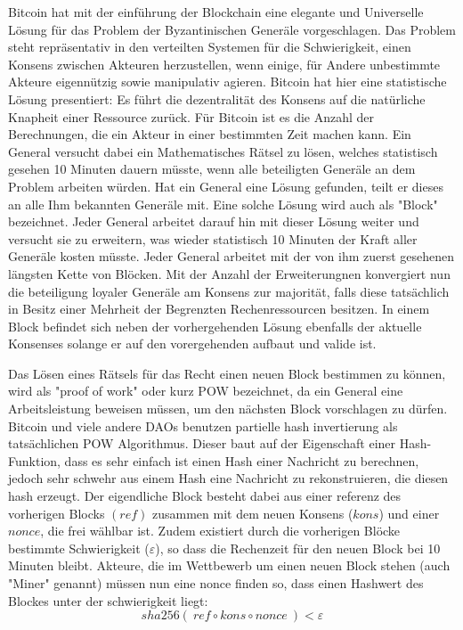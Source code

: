 \documentclass[]{article}
\begin{document}
Bitcoin hat mit der einführung der Blockchain eine elegante und Universelle Lösung für das Problem der Byzantinischen Generäle vorgeschlagen. Das Problem steht repräsentativ in den verteilten Systemen für die Schwierigkeit, einen Konsens zwischen Akteuren herzustellen, wenn einige, für Andere unbestimmte Akteure eigennützig sowie manipulativ agieren. 
Bitcoin hat hier eine statistische Lösung presentiert: Es führt die dezentralität des Konsens auf die natürliche Knapheit einer Ressource zurück. Für Bitcoin ist es die Anzahl der Berechnungen, die ein Akteur in einer bestimmten Zeit machen kann. Ein General versucht dabei ein Mathematisches Rätsel zu lösen, welches statistisch gesehen 10 Minuten dauern müsste, wenn alle beteiligten Generäle an dem Problem arbeiten würden. Hat ein General eine Lösung gefunden, teilt er dieses an alle Ihm bekannten Generäle mit. Eine solche Lösung wird auch als "Block" bezeichnet. Jeder General arbeitet darauf hin mit dieser Lösung weiter und versucht sie zu erweitern, was wieder statistisch 10 Minuten der Kraft aller Generäle kosten müsste. Jeder General arbeitet mit der von ihm zuerst gesehenen längsten Kette von Blöcken. Mit der Anzahl der Erweiterungnen konvergiert nun die beteiligung loyaler Generäle am Konsens zur majorität, falls diese tatsächlich in Besitz einer Mehrheit der Begrenzten Rechenressourcen besitzen.
In einem Block befindet sich neben der vorhergehenden Lösung ebenfalls der aktuelle Konsenses solange er auf den vorergehenden aufbaut und valide ist.

Das Lösen eines Rätsels für das Recht einen neuen Block bestimmen zu können, wird als "proof of work" oder kurz POW bezeichnet, da ein General eine Arbeitsleistung beweisen müssen, um den nächsten Block vorschlagen zu dürfen. Bitcoin und viele andere DAOs benutzen partielle hash invertierung als tatsächlichen POW Algorithmus. Dieser baut auf der Eigenschaft einer Hash-Funktion, dass es sehr einfach ist einen Hash einer Nachricht zu berechnen, jedoch sehr schwehr aus einem Hash eine Nachricht zu rekonstruieren, die diesen hash erzeugt. Der eigendliche Block besteht dabei aus einer referenz des vorherigen Blocks $(ref)$ zusammen mit dem neuen Konsens ($kons$) und einer $nonce$, die frei wählbar ist. Zudem existiert durch die vorherigen Blöcke bestimmte Schwierigkeit ($\varepsilon$), so dass die Rechenzeit für den neuen Block bei 10 Minuten bleibt. Akteure, die im Wettbewerb um einen neuen Block stehen (auch "Miner" genannt) müssen nun eine nonce finden so, dass einen Hashwert des Blockes unter der schwierigkeit liegt:
\[ sha256(\ ref\circ kons\circ nonce\ ) < \varepsilon \] 
\end{document}
